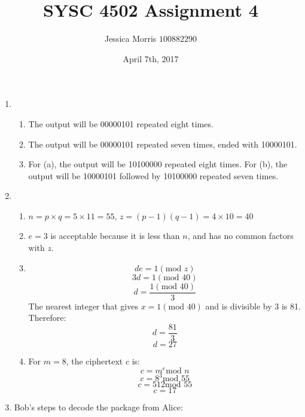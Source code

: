 \documentclass{article}
\title{SYSC 4502 Assignment 4}
\date{April 7th, 2017}
\author{Jessica Morris \(100882290\)}
\begin{document}
\maketitle

\begin{enumerate}

\item
\begin{enumerate}

\item The output will be 00000101 repeated eight times.

\item The output will be 00000101 repeated seven times, ended with 10000101.

\item For (a), the output will be 10100000 repeated eight times. For (b), the output will be 10000101 followed by 
10100000 repeated seven times.

\end{enumerate}

\item
\begin{enumerate}

\item $ n = p \times q = 5 \times 11 = 55 $, $ z = (p-1)(q-1) = 4 \times 10 = 40 $

\item $ e = 3 $ is acceptable because it is less than $n$, and has no common factors with $z$.

\item $$ de = 1(\text{mod } z) $$
$$ 3d = 1(\text{mod } 40) $$
$$ d = \frac{1(\text{mod } 40)}{3} $$
The nearest integer that gives $ x = 1(\text{mod } 40) $ and is divisible by 3 is 81. Therefore:
$$ d = \frac{81}{3} $$
$$ d = 27 $$

\item For $ m = 8 $, the ciphertext $c$ is:
$$ c = m^e \text{mod } n $$
$$ c = 8^3 \text{mod } 55 $$
$$ c = 512 \text{mod } 55 $$
$$ c = 17 $$

\end{enumerate}

\item Bob's steps to decode the package from Alice:

\hspace*{-2cm}
\end{enumerate}
\end{document}

